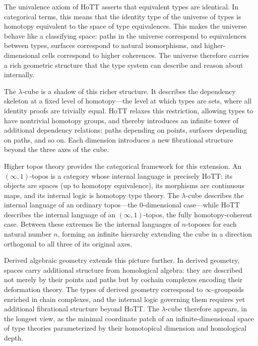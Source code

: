 \documentclass[12pt,a4paper]{article}
\theoremstyle{plain}
\theoremstyle{definition}
\begin{document}
The univalence axiom of HoTT asserts that equivalent types are identical. In categorical terms, this means that the identity type of the universe of types is homotopy equivalent to the space of type equivalences. This makes the universe behave like a classifying space: paths in the universe correspond to equivalences between types, surfaces correspond to natural isomorphisms, and higher-dimensional cells correspond to higher coherences. The universe therefore carries a rich geometric structure that the type system can describe and reason about internally.

The $\lambda$-cube is a shadow of this richer structure. It describes the dependency skeleton at a fixed level of homotopy---the level at which types are sets, where all identity proofs are trivially equal. HoTT relaxes this restriction, allowing types to have nontrivial homotopy groups, and thereby introduces an infinite tower of additional dependency relations: paths depending on points, surfaces depending on paths, and so on. Each dimension introduces a new fibrational structure beyond the three axes of the cube.

Higher topos theory provides the categorical framework for this extension. An $(\infty,1)$-topos is a category whose internal language is precisely HoTT: its objects are spaces (up to homotopy equivalence), its morphisms are continuous maps, and its internal logic is homotopy type theory. The $\lambda$-cube describes the internal language of an ordinary topos---the $0$-dimensional case---while HoTT describes the internal language of an $(\infty,1)$-topos, the fully homotopy-coherent case. Between these extremes lie the internal languages of $n$-toposes for each natural number $n$, forming an infinite hierarchy extending the cube in a direction orthogonal to all three of its original axes.

Derived algebraic geometry extends this picture further. In derived geometry, spaces carry additional structure from homological algebra: they are described not merely by their points and paths but by cochain complexes encoding their deformation theory. The types of derived geometry correspond to $\infty$-groupoids enriched in chain complexes, and the internal logic governing them requires yet additional fibrational structure beyond HoTT. The $\lambda$-cube therefore appears, in the longest view, as the minimal coordinate patch of an infinite-dimensional space of type theories parameterized by their homotopical dimension and homological depth.

\end{document}
